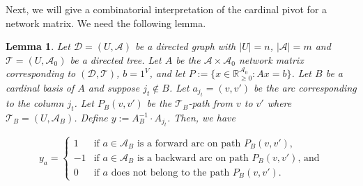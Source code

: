 \documentclass[11pt]{article}
\newcommand{\R}{\mathbb{R}}
\newtheorem{lemma}[theorem]{Lemma}
\begin{document}
\medskip










Next, we will give a combinatorial interpretation of the cardinal pivot for a network matrix. We need the following lemma. 

\begin{lemma}\label{lem:Forward-Backward-Formula}
Let $\mathcal{D}=(U,\mathcal{A})$ be a directed graph with $|U|=n$, $|\mathcal{A}|=m$ and $\mathcal{T}=(U,\mathcal{A}_0)$ be a directed tree. Let $A$ be the $\mathcal{A}\times \mathcal{A}_0$ network matrix corresponding to $(\mathcal{D},\mathcal{T})$, $b=1^V$, and let $P:=\{x\in \R^{\mathcal{A}_0}_{\ge 0}: Ax=b \}$. 
Let $B$ be a cardinal basis of $A$ and suppose $j_t\notin B$. Let $a_{j_t}=(v,v')$ be the arc corresponding to the column $j_t$. Let $P_B(v,v')$ be the $\mathcal{T}_B$-path from $v$ to $v'$ where $\mathcal{T}_B=(U,\mathcal{A}_B)$. Define $y:=A_B^{-1}\cdot A_{j_t}$. Then, we have

    \begin{equation}\label{eq:Forward-Backward-Formula}
    y_a=\left\{
    \begin{array}{cc}
        1 & \textrm{if $a\in\mathcal{A}_B$ is a forward arc on path $P_B(v,v')$,}\\
        -1 & \textrm{if $a\in\mathcal{A}_B$ is a backward arc on path $P_B(v,v')$, and} \\
        0 & \textrm{if $a$ does not belong to the path $P_B(v,v')$.}
    \end{array}
    \right.
\end{equation}
\end{lemma}
\end{document}
